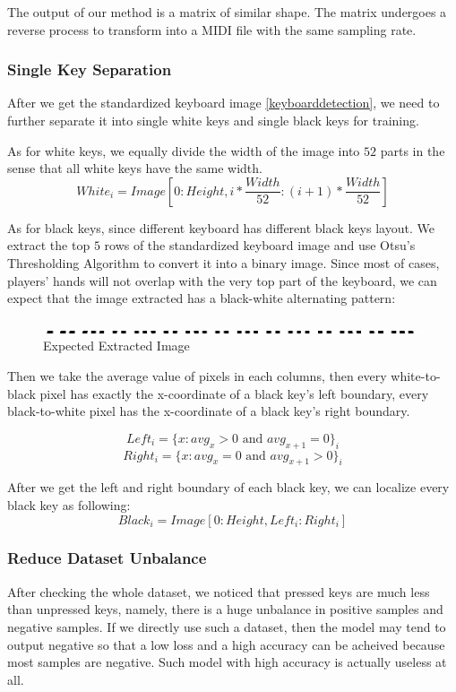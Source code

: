 \documentclass[10pt,twocolumn,letterpaper]{article}
\begin{document}
The output of our method is a matrix of similar shape. 
The matrix undergoes a reverse process to transform into a MIDI file with the same sampling rate.

\subsubsection{Single Key Separation}

After we get the standardized keyboard image \ref{keyboarddetection}, we need to further separate it into single white keys and single black keys for training.

As for white keys, we equally divide the width of the image into \(52\) parts in the sense that all white keys have the same width.
\[White_i = Image[0:Height, i * \frac{Width}{52}: (i + 1)*\frac{Width}{52}]\]

As for black keys, since different keyboard has different black keys layout. We extract the top \(5\) rows of the standardized keyboard image and use Otsu's Thresholding Algorithm to convert it into a binary image. Since most of cases, players' hands will not overlap with the very top part of the keyboard, we can expect that the image extracted has a black-white alternating pattern:

\begin{figure}[h!]
   \centering
   \includegraphics[width=\linewidth, height=0.04\linewidth]{fig/17.jpg}
   \caption{Expected Extracted Image}
\end{figure}

Then we take the average value of pixels in each columns, then every white-to-black pixel has exactly the x-coordinate of a black key's left boundary, every black-to-white pixel has the x-coordinate of a black key's right boundary.

\[Left_i = \{x: avg_x > 0 \text{ and } avg_{x + 1} = 0\}_i\]
\[Right_i = \{x: avg_x = 0 \text{ and } avg_{x + 1} > 0\}_i\]

After we get the left and right boundary of each black key, we can localize every black key as following:
\[Black_i = Image[0:Height, Left_i : Right_i]\]

\subsubsection{Reduce Dataset Unbalance}

After checking the whole dataset, we noticed that pressed keys are much less than unpressed keys, namely, there is a huge unbalance in positive samples and negative samples. If we directly use such a dataset, then the model may tend to output negative so that a low loss and a high accuracy can be acheived because most samples are negative. Such model with high accuracy is actually useless at all.
\end{document}

